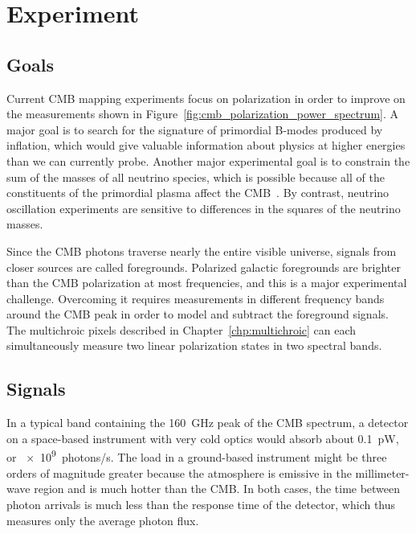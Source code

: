 \section{Experiment}
\label{sec:cmb.experiment}

\subsection{Goals}
\label{cmb.experiment.goals}

Current CMB mapping experiments focus on polarization in order to improve on the measurements shown in Figure~\ref{fig:cmb_polarization_power_spectrum}.
A major goal is to search for the signature of primordial B-modes produced by inflation, which would give valuable information about physics at higher energies than we can currently probe.
Another major experimental goal is to constrain the sum of the masses of all neutrino species, which is possible because all of the constituents of the primordial plasma affect the CMB~\autocite{CMBS4ScienceBook}.
By contrast, neutrino oscillation experiments are sensitive to differences in the squares of the neutrino masses.

Since the CMB photons traverse nearly the entire visible universe, signals from closer sources are called foregrounds.
Polarized galactic foregrounds are brighter than the CMB polarization at most frequencies, and this is a major experimental challenge.
Overcoming it requires measurements in different frequency bands around the CMB peak in order to model and subtract the foreground signals.
The multichroic pixels described in Chapter~\ref{chp:multichroic} can each simultaneously measure two linear polarization states in two spectral bands.


\subsection{Signals}
\label{sec:cmb.experiment.signals}

In a typical band containing the \SI{160}{GHz} peak of the CMB spectrum, a detector on a space-based instrument with very cold optics would absorb about \SI{0.1}{pW}, or \SI{e9}{photons/s}.
The load in a ground-based instrument might be three orders of magnitude greater because the atmosphere is emissive in the millimeter-wave region and is much hotter than the CMB.
In both cases, the time between photon arrivals is much less than the response time of the detector, which thus measures only the average photon flux.

